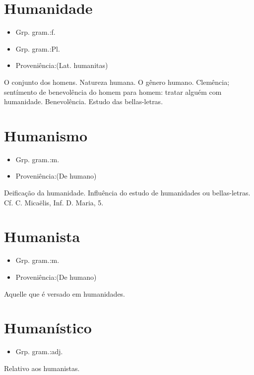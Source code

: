 \documentclass{article}
\begin{document}
\section{Humanidade}
\begin{itemize}
\item {Grp. gram.:f.}
\end{itemize}
\begin{itemize}
\item {Grp. gram.:Pl.}
\end{itemize}
\begin{itemize}
\item {Proveniência:(Lat. \textunderscore humanitas\textunderscore )}
\end{itemize}
O conjunto dos homens.
Natureza humana.
O gênero humano.
Clemência; sentímento de benevolência do homem para homem: \textunderscore tratar alguém com humanidade\textunderscore .
Benevolência.
Estudo das bellas-letras.
\section{Humanismo}
\begin{itemize}
\item {Grp. gram.:m.}
\end{itemize}
\begin{itemize}
\item {Proveniência:(De \textunderscore humano\textunderscore )}
\end{itemize}
Deificação da humanidade.
Influência do estudo de humanidades ou bellas-letras. Cf. C. Micaëlis, \textunderscore Inf. D. Maria\textunderscore , 5.
\section{Humanista}
\begin{itemize}
\item {Grp. gram.:m.}
\end{itemize}
\begin{itemize}
\item {Proveniência:(De \textunderscore humano\textunderscore )}
\end{itemize}
Aquelle que é versado em humanidades.
\section{Humanístico}
\begin{itemize}
\item {Grp. gram.:adj.}
\end{itemize}
Relativo aos humanistas.
\end{document}
